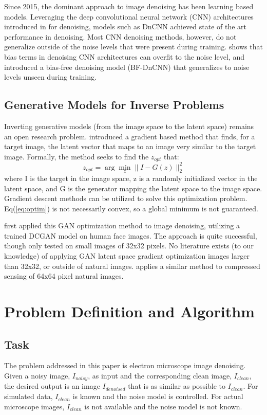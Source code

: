 \documentclass{article}
\begin{document}
Since 2015, the dominant approach to image denoising has been learning based models. Leveraging the deep convolutional neural network (CNN) architectures introduced in \cite{lecun} for denoising, models such as DnCNN \cite{dncnn} achieved state of the art performance in denoising. Most CNN denoising methods, however, do not generalize outside of the noise levels that were present during training. \cite{mohan19} shows that bias terms in denoising CNN architectures can overfit to the noise level, and introduced a bias-free denoising model (BF-DnCNN) that generalizes to noise levels unseen during training.  


\subsection{Generative Models for Inverse Problems}
Inverting generative models (from the image space to the latent space) remains an open research problem. \cite{creswell} introduced a gradient based method that finds, for a target image, the latent vector that maps to an image very similar to the target image. Formally, the method seeks to find the $z_{opt}$ that:
\begin{equation}\label{eq:optim}
    z_{opt} = \arg\min_z \|I - G(z)\|_2^2
\end{equation}
where I is the target in the image space, z is a randomly initialized vector in the latent space, and G is the generator mapping the latent space to the image space. Gradient descent methods can be utilized to solve this optimization problem. Eq(\ref{eq:optim}) is not necessarily convex, so a global minimum is not guaranteed.  

\cite{lipton17} first applied this GAN optimization method to image denoising, utilizing a trained DCGAN model on human face images. The approach is quite successful, though only tested on small images of 32x32 pixels. No literature exists (to our knowledge) of applying GAN latent space gradient optimization images larger than 32x32, or outside of natural images. \cite{bora17} applies a similar method to compressed sensing of 64x64 pixel natural images.

\section{Problem Definition and Algorithm}
\subsection{Task}
The problem addressed in this paper is electron microscope image denoising. Given a noisy image, $I_{noisy}$, as input and the corresponding clean image, $I_{clean}$, the desired output is an image $I_{denoised}$ that is as similar as possible to $I_{clean}$. For simulated data, $I_{clean}$ is known and the noise model is controlled. For actual microscope images, $I_{clean}$ is not available and the noise model is not known.
\end{document}
